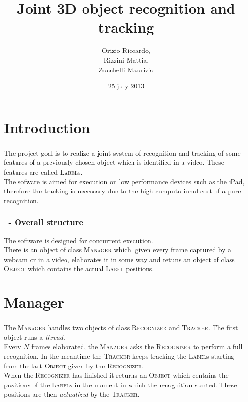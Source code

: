 \documentclass{beamer}
\title{Joint 3D object recognition and tracking}
\author[Orizio, Rizzini, Zucchelli]{Orizio Riccardo,\\Rizzini Mattia,\\Zucchelli Maurizio}
\date{25 july 2013}
\institute[UniBS]{University of Brescia}
\begin{document}
	\begin{frame}
		\maketitle
	\end{frame}

	\section{Introduction}
	
	\begin{frame}
		\frametitle{\insertsection}
		The project goal is to realize a joint system of recognition and tracking
		of some features of a previously chosen object which is identified in a video.
		These features are called \textsc{Label}s.\\
		The sofware is aimed for execution on low performance devices such as the
		iPad, therefore the tracking is necessary due to the high computational
		cost of a pure recognition.\\
	\end{frame}

	\begin{frame}
		\frametitle{\insertsection\ - Overall structure}
		The software is designed for concurrent execution.\\
		There is an object of class \textsc{Manager} which, given every frame
		captured by a webcam or in a video, elaborates it in some way and retuns
		an object of class \textsc{Object} which contains the actual \textsc{Label}
		positions.\\
	\end{frame}

	\AtBeginSection[]
	{
		\begin{frame}
			\frametitle{Outline}
			\tableofcontents[currentsection]
		\end{frame}
	}
	\section{Manager}

	\begin{frame}
		\frametitle{\insertsection}
		The \textsc{Manager} handles two objects of class \textsc{Recognizer} and
		\textsc{Tracker}. The first object runs a \emph{thread}.\\
		Every $N$ frames elaborated, the \textsc{Manager} asks the
		\textsc{Recognizer} to perform a full recognition. In the meantime the
		\textsc{Tracker} keeps tracking the \textsc{Label}s starting from the last
		\textsc{Object} given by the \textsc{Recognizer}.\\
		When the \textsc{Recognizer} has finished it returns an \textsc{Object}
		which contains the positions of the \textsc{Label}s in the moment in which
		the recognition started. These positions are then \emph{actualized} by the
		\textsc{Tracker}.\\
	\end{frame}
\end{document}
